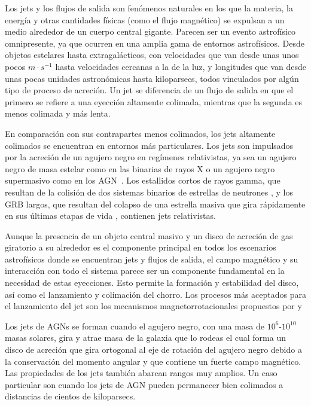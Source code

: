 \documentclass[12pt,a4paper]{book}
\begin{document}
{\color{blue} Los jets y los flujos de salida son fenómenos naturales en los que la materia, la energía y otras cantidades físicas (como el flujo magnético) se expulsan a un medio alrededor de un cuerpo central gigante.
Parecen ser un evento astrofísico omnipresente, ya que ocurren en una amplia gama de entornos astrofísicos.
Desde objetos estelares hasta extragalácticos, con velocidades que van desde unas unos pocos $m \cdot s^{-1}$ hasta velocidades cercanas a la de la luz, y longitudes que van desde unas pocas unidades astronómicas 
hasta kiloparsecs, todos vinculados por algún tipo de proceso de acreción.
Un jet se diferencia de un flujo de salida en que el primero se refiere a una eyección altamente colimada, mientras que la segunda es menos colimada y más lenta.

En comparación con sus contrapartes menos colimados, los jets altamente colimados se encuentran en entornos más particulares. Los jets son impulsados por la acreción de un agujero negro en regímenes relativistas, 
ya sea un agujero negro de masa estelar como en las binarias de rayos X \cite{2020ApJ...895L..31E} o un agujero negro supermasivo como en los AGN~\cite{2019ARA&A..57..467B}. Los estallidos cortos de rayos gamma, 
que resultan de la colisión de dos sistemas binarios de estrellas de neutrones \cite{2021MNRAS.506.3483P}, y los GRB largos, que resultan del colapso de una estrella masiva que gira rápidamente en sus últimas etapas de vida
\cite{2022MNRAS.509.5964S}, contienen jets relativistas.

Aunque la presencia de un objeto central masivo y un disco de acreción de gas giratorio a su alrededor es el componente principal en todos los escenarios astrofísicos donde se encuentran jets y flujos de salida, 
el campo magnético y su interacción con todo el sistema parece ser un componente fundamental en la necesidad de estas eyecciones.
Esto permite la formación y estabilidad del disco, así como el lanzamiento y colimación del chorro. Los procesos más aceptados para el lanzamiento del jet son los mecanismos magnetorrotacionales propuestos 
por \cite{1977MNRAS.179..433B} y \cite{1982MNRAS.199..883B}}


Los jets de AGNs se forman cuando el agujero negro, con una masa de $10^6$-$10^{10}$ masas solares, gira y atrae masa de la galaxia que lo rodeas el cual forma un disco de acreción
que gira ortogonal al eje de rotación del agujero negro debido a la conservación del momento angular y que contiene un fuerte campo magnético. %
Las propiedades de los jets también abarcan rangos muy amplios. Un caso particular son cuando los jets de AGN pueden permanecer bien colimados a distancias de cientos de kiloparsecs. %
\end{document}
